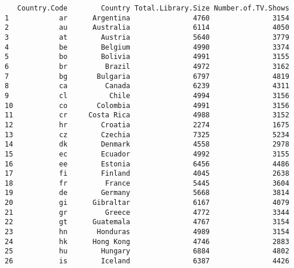 \documentclass[
]{article}
\newenvironment{Shaded}{\begin{snugshade}}{\end{snugshade}}
\newcommand{\NormalTok}[1]{#1}
\newcommand{\OtherTok}[1]{\textcolor[rgb]{0.56,0.35,0.01}{#1}}
\newcommand{\SpecialCharTok}[1]{\textcolor[rgb]{0.81,0.36,0.00}{\textbf{#1}}}
\begin{document}
\begin{Shaded}
\end{Shaded}

\begin{verbatim}
   Country.Code        Country Total.Library.Size Number.of.TV.Shows
1            ar      Argentina               4760               3154
2            au      Australia               6114               4050
3            at        Austria               5640               3779
4            be        Belgium               4990               3374
5            bo        Bolivia               4991               3155
6            br         Brazil               4972               3162
7            bg       Bulgaria               6797               4819
8            ca         Canada               6239               4311
9            cl          Chile               4994               3156
10           co       Colombia               4991               3156
11           cr     Costa Rica               4988               3152
12           hr        Croatia               2274               1675
13           cz        Czechia               7325               5234
14           dk        Denmark               4558               2978
15           ec        Ecuador               4992               3155
16           ee        Estonia               6456               4486
17           fi        Finland               4045               2638
18           fr         France               5445               3604
19           de        Germany               5668               3814
20           gi      Gibraltar               6167               4079
21           gr         Greece               4772               3344
22           gt      Guatemala               4767               3154
23           hn       Honduras               4989               3154
24           hk      Hong Kong               4746               2883
25           hu        Hungary               6884               4802
26           is        Iceland               6387               4426

\end{verbatim}
\end{document}
